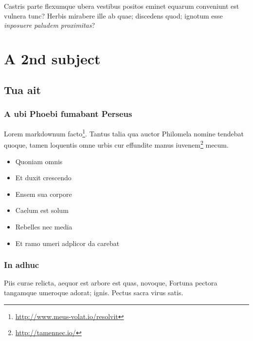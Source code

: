 \documentclass[
  12pt,
  a4paper,
  oneside,tablecaptionabove
]{scrbook}
\DeclareRobustCommand{\href}[2]{#2\footnote{\url{#1}}}
\providecommand{\tightlist}{%
  \setlength{\itemsep}{0pt}\setlength{\parskip}{0pt}}
\def \logbuchsubjectmark {}
\def \logbuchsubjectdatemark {}
\def \logbuchsubjectauthmark {}
\begin{document}
Castris parte flexumque ubera vestibus positos eminet equarum conveniunt
est vulnera tunc? Herbis mirabere ille ab quae; discedens quod; ignotum
esse \emph{inposuere paludem proximitas}?

\chapter*{\LARGE{A 2nd subject}}

\setcounter{section}{0}

\def \logbuchsubjectmark {A 2nd subject}
\def \logbuchsubjectdatemark {09.03.2019 00:58}
\def \logbuchsubjectauthmark {\textit{bertolino}}
\thispagestyle{eisvogel-header-footer}
\hypertarget{tua-ait}{%
\section{Tua ait}\label{tua-ait}}

\hypertarget{a-ubi-phoebi-fumabant-perseus}{%
\subsection{A ubi Phoebi fumabant
Perseus}\label{a-ubi-phoebi-fumabant-perseus}}

Lorem markdownum \href{http://www.meus-volat.io/resolvit}{facto}. Tantus
talia qua auctor Philomela nomine tendebat quoque, tamen loquentis omne
urbis cur effundite manus \href{http://tamennec.io/}{iuvenem} mecum.

\begin{itemize}
\tightlist
\item
  Quoniam omnis
\item
  Et duxit crescendo
\item
  Ensem sua corpore
\item
  Caelum est solum
\item
  Rebelles nec media
\item
  Et ramo umeri adplicor da carebat
\end{itemize}

\hypertarget{in-adhuc}{%
\subsection{In adhuc}\label{in-adhuc}}

Piis curae relicta, aequor est arbore est quas, novoque, Fortuna pectora
tangamque umeroque adorat; ignis. Pectus sacra virus satis.
\end{document}
